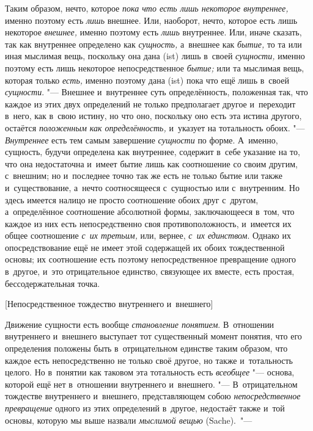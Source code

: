 Таким образом, нечто, которое {\em пока что есть лишь
некоторое внутреннее,} именно поэтому есть {\em лишь}
внешнее. Или, наоборот, нечто, которое есть лишь некоторое
{\em внешнее,} именно поэтому есть
{\em лишь} внутреннее. Или, иначе сказать, так как
внутреннее определено как {\em сущность,} а~внешнее как
{\em бытие,} то та или иная мыслимая вещь, поскольку
она дана (ist) лишь в~своей {\em сущности,} именно
поэтому есть лишь некоторое непосредственное
{\em бытие;} или та мыслимая вещь, которая только
{\em есть,} именно поэтому дана (ist) пока что ещё лишь
в~своей {\em сущности}. "--- Внешнее и~внутреннее суть
определённость, положенная так, что каждое из этих двух определений не
только предполагает другое и~переходит в~него, как в~свою истину, но что
оно, поскольку оно есть эта истина другого, остаётся
{\em положенным как определённость,} и~указует на
тотальность обоих. "--- {\em Внутреннее} есть тем самым
завершение {\em сущности} по форме. А~именно, сущность,
будучи определена как внутреннее, содержит в~себе указание на то, что она
недостаточна и~имеет бытие лишь как соотношение со своим другим, с~внешним;
но и~последнее точно так же есть не только бытие или также и~существование,
а~нечто соотносящееся с~сущностью или с~внутренним. Но здесь имеется налицо
не просто соотношение обоих друг с~другом, а~определённое соотношение
абсолютной формы, заключающееся в~том, что каждое из них есть
непосредственно своя противоположность, и~имеется их общее соотношение
{\em с~их третьим,} или, вернее,
{\em с~их единством}. Однако их опосредствование ещё не
имеет этой содержащей их обоих тождественной основы; их соотношение есть
поэтому непосредственное превращение одного в~другое, и~это отрицательное
единство, связующее их вместе, есть простая, бессодержательная точка.

%
  {[Непосредственное тождество внутреннего и~внешнего]}

Движение сущности есть вообще {\em становление
понятием}. В~отношении внутреннего и~внешнего выступает тот существенный
момент понятия, что его определения положены быть в~отрицательном единстве
таким образом, что каждое есть непосредственно не только своё другое, но
также и~тотальность целого. Но в~понятии как таковом эта тотальность есть
{\em всеобщее} "--- основа, которой ещё нет в~отношении
внутреннего и~внешнего. "--- В~отрицательном тождестве внутреннего и~внешнего,
представляющем собою {\em непосредственное превращение}
одного из этих определений в~другое, недостаёт также и~той основы, которую
мы выше назвали {\em мыслимой вещью} (Sache).~"---

